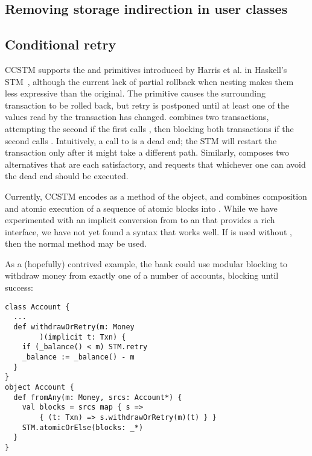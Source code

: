 \subsection{Removing storage indirection in user classes}


\subsection{Conditional retry}

CCSTM supports the  and  primitives introduced by
Harris et al. in Haskell's STM~\cite{harris05ctm}, although the current
lack of partial rollback when nesting makes them less expressive than the original.
The  primitive causes the surrounding transaction to be rolled
back, but retry is postponed until at least one of the values read by
the transaction has changed.   combines two transactions,
attempting the second if the first calls , then blocking
both transactions if the second calls .  Intuitively, a call
to  is a dead end; the STM will restart the transaction
only after it might take a different path.  Similarly, 
composes two alternatives that are each satisfactory, and requests that
whichever one can avoid the dead end should be executed.

Currently, CCSTM encodes  as a method of the  object, and 
combines composition and atomic execution of a sequence of atomic blocks into
\code{STM.atomicOrElse[}\code{](blocks: (}\code{ => }\code{)*): }.
While we have experimented with an implicit conversion from 
\code{ => } to an  that provides a
rich interface, we have not yet found a syntax that works well.  If
 is used without , then the normal 
method may be used.

As a (hopefully) contrived example,
the bank could use modular blocking to withdraw money from exactly one of a number of
accounts, blocking until success:
\lstset{numbers=none}
\lstset{xleftmargin=0.125in}
\begin{lstlisting}
class Account {
  ...
  def withdrawOrRetry(m: Money
        )(implicit t: Txn) {
    if (_balance() < m) STM.retry
    _balance := _balance() - m
  }
}
object Account {
  def fromAny(m: Money, srcs: Account*) {
    val blocks = srcs map { s =>
        { (t: Txn) => s.withdrawOrRetry(m)(t) } }
    STM.atomicOrElse(blocks: _*)
  }
}
\end{lstlisting}
\lstset{numbers=left}
\lstset{xleftmargin=0.25in}


